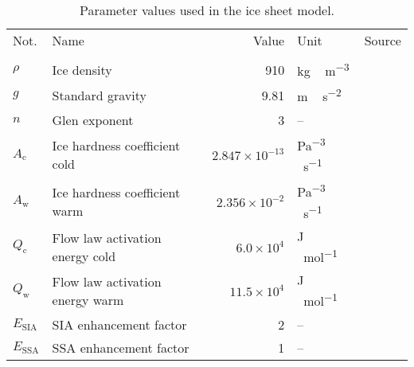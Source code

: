 \documentclass[tc, manuscript]{copernicus}
\begin{document}
    \begin{table*}
      \caption{%
        Parameter values used in the ice sheet model.}
      \label{tab:params}
      \scalebox{0.8}
      {\begin{tabular}{llrll}
        \tophline

        Not.    & Name & Value & Unit & Source \\

        \middlehline
        \multicolumn{2}{l}{{Ice rheology}} \\
        \middlehline

        $\rho$  & Ice density
                & 910
                & \unit{kg\,m^{-3}}
                & \citet{Aschwanden.etal.2012} \\

        $g$     & Standard gravity
                & 9.81
                & \unit{m\,s^{-2}}
                & \citet{Aschwanden.etal.2012} \\

        $n$     & Glen exponent
                & 3
                & --
                & \citet{Cuffey.Paterson.2010} \\

        $A_{\mathrm{c}}$   & Ice hardness coefficient cold
                & $2.847 \times 10^{-13}$
                & \unit{Pa^{-3}\,s^{-1}}
                & \citet{Cuffey.Paterson.2010} \\

        $A_{\mathrm{w}}$   & Ice hardness coefficient warm
                & $2.356 \times 10^{-2}$
                & \unit{Pa^{-3}\,s^{-1}}
                & \citet{Cuffey.Paterson.2010} \\

        $Q_{\mathrm{c}}$   & Flow law activation energy cold
                & $6.0 \times 10^4$
                & \unit{J\,mol^{-1}}
                & \citet{Cuffey.Paterson.2010} \\

        $Q_{\mathrm{w}}$   & Flow law activation energy warm
                & $11.5 \times 10^4$
                & \unit{J\,mol^{-1}}
                & \citet{Cuffey.Paterson.2010} \\

        $E_{\text{SIA}}$   & SIA enhancement factor
                & 2
                & --
                & \citet{Cuffey.Paterson.2010} \\

        $E_{\text{SSA}}$   & SSA enhancement factor
                & 1
                & --
                & \citet{Cuffey.Paterson.2010} \\


\end{tabular}}
\end{table*}
\end{document}
